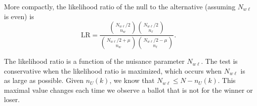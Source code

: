 \documentclass[12pt]{article}
\newcommand{\beq}{\begin{equation}}
\newcommand{\eeq}{\end{equation}}
\begin{document}
More compactly, the likelihood ratio of the null to the alternative (assuming $N_{w\ell}$ is even) is
\beq
   \mbox{LR} = \frac{ {N_{w\ell}/2 \choose n_w}{N_{w\ell}/2 \choose n_\ell}}
           {{N_{w\ell}/2+\mu \choose n_w}{N_{w\ell}/2-\mu \choose n_\ell}}.
\eeq

The likelihood ratio is a function of the nuisance parameter $N_{w\ell}$.
The test is conservative when the likelihood ratio is maximized, which occurs when $N_{w\ell}$ is as large as possible. 
Given $n_U(k)$, we know that $N_{w\ell} \leq N - n_U(k)$.
This maximal value changes each time we observe a ballot that is not for the winner or loser.






\end{document}
